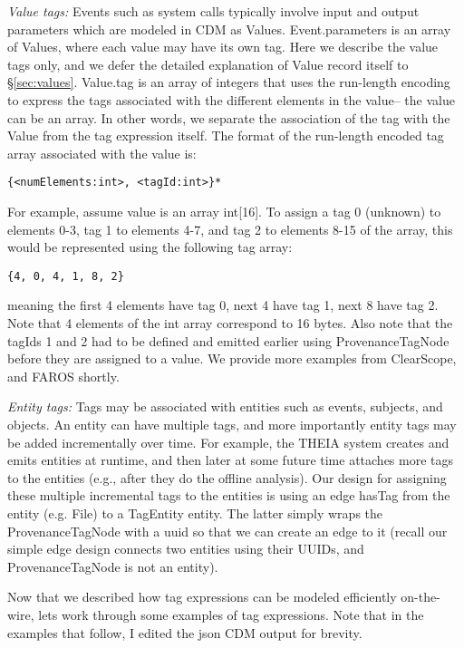 {\em Value tags:} Events such as system calls typically involve input and output parameters which are modeled in CDM as {\sf Value}s. Event.parameters is an array of Values, where each value may have its own tag. Here we describe the value tags only, and we defer the detailed explanation of Value record itself to \S \ref{sec:values}. Value.tag is an array of integers that uses the run-length encoding to express the tags associated with the different elements in the value-- the value can be an array. In other words, we separate the association of the tag with the Value from the tag expression itself. 
The format of the run-length encoded tag array associated with the value is:
\begin{Verbatim}[fontsize=\small]
{<numElements:int>, <tagId:int>}*
\end{Verbatim}
For example, assume value is an array int[16]. To assign a tag 0 (unknown) to elements 0-3, tag 1 to elements 4-7, and tag 2 to elements 8-15 of
the array, this would be represented using the following tag array:
\begin{Verbatim}[fontsize=\small]
{4, 0, 4, 1, 8, 2}
\end{Verbatim}
meaning the first 4 elements have tag 0, next 4 have tag 1, next 8 have tag 2.
Note that 4 elements of the int array correspond to 16 bytes.
Also note that the tagIds 1 and 2 had to be defined and emitted earlier using ProvenanceTagNode before they are assigned to a value.
We provide more examples from ClearScope, and FAROS shortly.

{\em Entity tags:} Tags may be associated with entities such as events, subjects, and objects. An entity can have multiple tags, and more importantly entity tags may be added incrementally over time. For example, the THEIA system creates and emits entities at runtime, and then later at some future time attaches more tags to the entities (e.g., after they do the offline analysis). Our design for assigning these multiple incremental tags to the entities is using an edge {\sf hasTag} from the entity (e.g. File) to a {\sf TagEntity} entity. The latter simply wraps the ProvenanceTagNode with a uuid so that we can create an edge to it (recall our simple edge design connects two entities using their UUIDs, and ProvenanceTagNode is not an entity). 

Now that we described how tag expressions can be modeled efficiently on-the-wire, lets work through some examples of tag expressions. Note that in the examples that follow, I edited the json CDM output for brevity.\\

